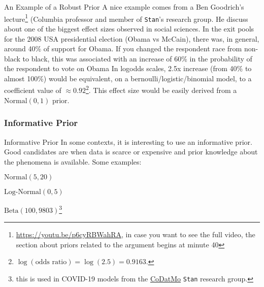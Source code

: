 \begin{frame}{An Example of a Robust Prior}
	\small
	A nice example comes from a Ben Goodrich's lecture\footnote{
	\url{https://youtu.be/p6cyRBWahRA},
	in case you want to see the full video,
	the section about priors related to the argument begins at minute 40}
	(Columbia professor and member of \texttt{Stan}'s research group.
	\vfill
	He discuss about one of the biggest effect sizes observed in social sciences.
	In the exit pools for the 2008 USA presidential election (Obama vs McCain),
	there was, in general, around 40\% of support for Obama.
	If you changed the respondent race from non-black to black,
	this was associated with an increase of 60\% in the probability of the respondent
	to vote on Obama
	\vfill
	In logodds scales, 2.5x increase (from 40\% to almost 100\%) would be equivalent,
	on a bernoulli/logistic/binomial model,
	to a coefficient value of $\approx 0.92$\footnote{
		$\log(\text{odds ratio}) = \log(2.5) = 0.9163$.}.
	This effect size would be easily derived from a $\text{Normal}(0, 1)$ prior.
\end{frame}

\subsubsection{Informative Prior}
\begin{frame}{Informative Prior}
	In some contexts, it is interesting to use an informative prior.
	Good candidates are when data is scarce or expensive and prior knowledge
	about the phenomena is available.
	\vfill
	Some examples:
	\begin{vfilleditems}
		\item $\text{Normal}(5, 20)$
		\item $\text{Log-Normal}(0, 5)$
		\item $\text{Beta}(100, 9803)$\footnote{
			this is used in COVID-19 models from the
			\href{https://codatmo.github.io}{CoDatMo} \texttt{Stan}
			research group.}
	\end{vfilleditems}
\end{frame}
